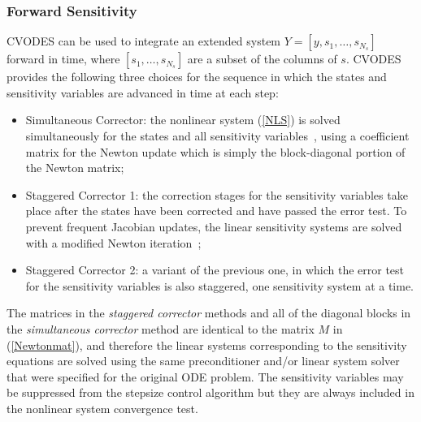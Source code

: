 \subsubsection{Forward Sensitivity}
CVODES can be used to integrate an extended system 
$Y = [y,s_1,\ldots,s_{N_s}]$ forward in time, where
$[s_1,\ldots,s_{N_s}]$ are a subset of the columns of $s$.
%
CVODES provides the following three choices for the sequence in which
the states and sensitivity variables are advanced in time at each step:
%
\begin{itemize}
\item Simultaneous Corrector: the nonlinear system (\ref{NLS}) is solved
  simultaneously for the states and all sensitivity variables~\cite{MaPe:97},
  using a coefficient matrix for the Newton update which is
  simply the block-diagonal portion of the Newton matrix;
\item Staggered Corrector 1: the correction stages for the sensitivity 
  variables take place after the states have been corrected and have passed 
  the error test. To prevent frequent Jacobian updates, the linear sensitivity 
  systems are solved with a modified Newton iteration~\cite{FTB:97};
\item Staggered Corrector 2: a variant of the previous one,
  in which the error test for the sensitivity variables is also staggered,
  one sensitivity system at a time.
\end{itemize}
%
The matrices in the {\em staggered corrector} methods and all of the 
diagonal blocks in the {\em simultaneous corrector} method are 
identical to the matrix $M$ in (\ref{Newtonmat}), and 
therefore the linear systems corresponding to the sensitivity equations
are solved using the same preconditioner and/or linear system solver that 
were specified for the original ODE problem. 
The sensitivity variables may be suppressed from the stepsize control
algorithm but they are always included in the nonlinear system convergence
test.


